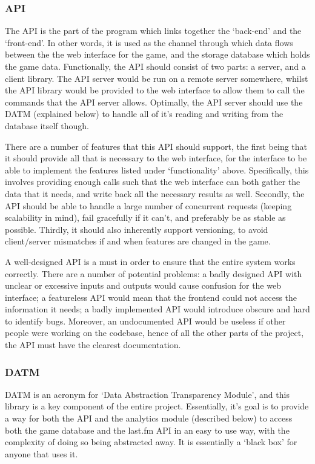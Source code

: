 \documentclass[a4paper,10pt,twoside]{article}
\begin{document}
\subsubsection{API}

The API is the part of the program which links together the `back-end' and the `front-end'. In other words, it is used as the channel through which data flows between the the web interface for the game, and the storage database which holds the game data. Functionally, the API should consist of two parts: a server, and a client library. The API server would be run on a remote server somewhere, whilst the API library would be provided to the web interface to allow them to call the commands that the API server allows. Optimally, the API server should use the DATM (explained below) to handle all of it's reading and writing from the database itself though. 

There are a number of features that this API should support, the first being that it should provide all that is necessary to the web interface, for the interface to be able to implement the features listed under `functionality' above. Specifically, this involves providing enough calls such that the web interface can both gather the data that it needs, and write back all the necessary results as well. Secondly, the API should be able to handle a large number of concurrent requests (keeping scalability in mind), fail gracefully if it can't, and preferably be as stable as possible. Thirdly, it should also inherently support versioning, to avoid client/server mismatches if and when features are changed in the game.

A well-designed API is a must in order to ensure that the entire system works correctly. There are a number of potential problems: a badly designed API with unclear or excessive inputs and outputs would cause confusion for the web interface; a featureless API would mean that the frontend could not access the information it needs; a badly implemented API would introduce obscure and hard to identify bugs. Moreover, an undocumented API would be useless if other people were working on the codebase, hence of all the other parts of the project, the API must have the clearest documentation.

\subsubsection{DATM}

DATM is an acronym for `Data Abstraction Transparency Module', and this library is a key component of the entire project. Essentially, it's goal is to provide a way for both the API and the analytics module (described below) to access both the game database and the last.fm API in an easy to use way, with the complexity of doing so being abstracted away. It is essentially a `black box' for anyone that uses it.
\end{document}
